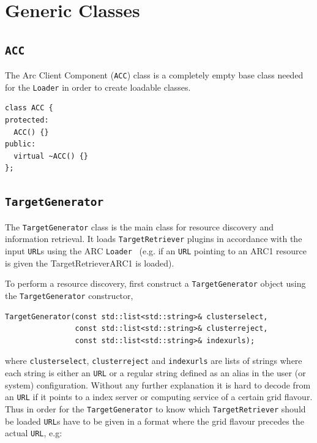 \documentclass{book}
\newcommand{\ACC}{\texttt{ACC}}
\newcommand{\TargetGenerator}{\texttt{TargetGenerator}}
\newcommand{\TargetRetriever}{\texttt{TargetRetriever}}
\newcommand{\URL}{\texttt{URL}}
\newcommand{\Loader}{\texttt{Loader}}
\begin{document}
\section{Generic Classes}
\label{sec:genclass}
\subsection{{\ACC}}
The Arc Client Component ({\ACC}) class is a completely empty base class needed for the {\Loader} 
in order to create loadable classes.

\begin{shaded}
\begin{verbatim}
class ACC {
protected:
  ACC() {}
public:
  virtual ~ACC() {}
};
\end{verbatim}
\end{shaded}

\subsection{{\TargetGenerator}} The {\TargetGenerator} class is the main class for resource discovery and information retrieval. It loads 
{\TargetRetriever} plugins in accordance with the input {\URL}s using the ARC {\Loader}~\cite{hed} (e.g. if an {\URL} pointing to an ARC1 
resource is given the TargetRetrieverARC1 is loaded).

To perform a resource discovery, first construct a {\TargetGenerator} object using the {\TargetGenerator} constructor,

\begin{shaded}
\begin{verbatim}
TargetGenerator(const std::list<std::string>& clusterselect,
                const std::list<std::string>& clusterreject,
                const std::list<std::string>& indexurls);
\end{verbatim}
\end{shaded}

where \texttt{clusterselect}, \texttt{clusterreject} and \texttt{indexurls} are lists of strings where each string is either 
an {\URL} or a regular string defined as an alias in the user (or system) configuration. Without any further explanation it is 
hard to decode from an {\URL} if it points to a index server or computing service of a certain grid flavour. Thus in order for 
the {\TargetGenerator} to know which {\TargetRetriever} should be loaded {\URL}s have to be given in a format where the grid 
flavour precedes the actual {\URL}, e.g:
\end{document}
